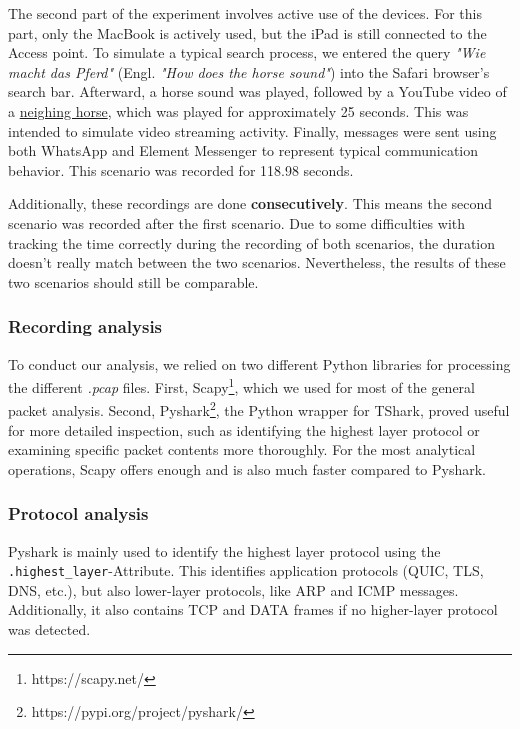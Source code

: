 \documentclass[sigconf,nonacm]{acmart}
\begin{document}
The second part of the experiment involves active use of the devices. For this part, only the MacBook is actively used, but the iPad is still connected to the Access point. To simulate a typical search process, we entered the query \textit{"Wie macht das Pferd"} (Engl. \textit{"How does the horse sound"}) into the Safari browser's search bar. Afterward, a horse sound was played, followed by a YouTube video of a \href{https://www.youtube.com/watch?v=xYMh68fCo54}{\color{blue}neighing horse}, which was played for approximately 25 seconds. This was intended to simulate video streaming activity. Finally, messages were sent using both WhatsApp and Element Messenger to represent typical communication behavior. This scenario was recorded for 118.98 seconds. 

Additionally, these recordings are done \textbf{consecutively}. This means the second scenario was recorded after the first scenario.
Due to some difficulties with tracking the time correctly during the recording of both scenarios, the duration doesn't really match between the two scenarios. 
Nevertheless, the results of these two scenarios should still be comparable.


\subsubsection{Recording analysis}
To conduct our analysis, we relied on two different Python libraries for processing the different \textit{.pcap} files. First, Scapy\footnote{https://scapy.net/}, which we used for most of the general packet analysis. Second, Pyshark\footnote{https://pypi.org/project/pyshark/}, the Python wrapper for TShark, proved useful for more detailed inspection, such as identifying the highest layer protocol or examining specific packet contents more thoroughly. For the most analytical operations, Scapy offers enough and is also much faster compared to Pyshark.

\subsubsection{Protocol analysis}
Pyshark is mainly used to identify the highest layer protocol using the \texttt{.highest\_layer}-Attribute. This identifies application protocols (QUIC, TLS, DNS, etc.), but also lower-layer protocols, like ARP and ICMP messages. Additionally, it also contains TCP and DATA frames if no higher-layer protocol was detected.
\end{document}
